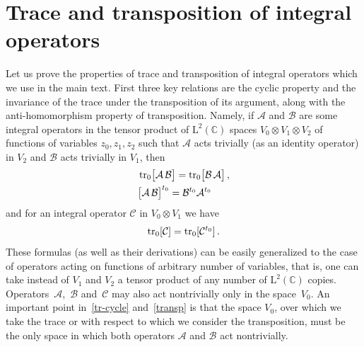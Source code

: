 \documentclass[a4paper,11pt]{article}
\newcommand{\tr}{\mathop{\rm tr}\nolimits}
\numberwithin{equation}{section}
\begin{document}
\section{Trace and transposition of integral operators}
\label{app:TrTransp}

Let us prove the properties of trace and transposition of integral operators which we use in the main text.
First three key relations are the cyclic property and the invariance of the trace under the transposition of its argument, along with the anti-homomorphism property of transposition.
Namely, if $\mathcal{A}$ and $\mathcal{B}$ are some integral operators in the tensor product of $\mathrm{L}^2(\mathbb{C})$ spaces $V_0\otimes V_1\otimes V_2$ of functions of variables $z_0, z_1, z_2$ such that $\mathcal{A}$ acts trivially (as an identity operator) in $V_2$ and $\mathcal{B}$ acts trivially in $V_1$, then
\begin{align}
	& \label{tr-cycle}
	\tr_0\bigl[\mathcal{A}\,\mathcal{B}\bigr] = \tr_0\bigl[\mathcal{B}\,\mathcal{A}\bigr] \,, \\
	& \label{transp}
	\bigl[\mathcal{A}\,\mathcal{B}\bigr]^{t_0} = \mathcal{B}^{t_0} \mathcal{A}^{t_0}
\end{align}
and for an integral operator $\mathcal{C}$ in $V_0\otimes V_1$ we have
\begin{equation} \label{tr-transp}
	\tr_0[\mathcal{C}] = \tr_0[\mathcal{C}^{t_0}] \,.
\end{equation}
These formulas (as well as their derivations) can be easily generalized to the case of operators acting on functions of arbitrary number of variables, that is, one can take instead of $V_1$ and $V_2$ a tensor product of any number of $\mathrm{L}^2(\mathbb{C})$ copies.
Operators~$\mathcal{A}$,~$\mathcal{B}$ and~$\mathcal{C}$ may also act nontrivially only in the space~$V_0$.
An important point in~\eqref{tr-cycle} and~\eqref{transp} is that the space $V_0$, over which we take the trace or with respect to which we consider the transposition, must be the only space in which both operators $\mathcal{A}$ and $\mathcal{B}$ act nontrivially.
\end{document}
